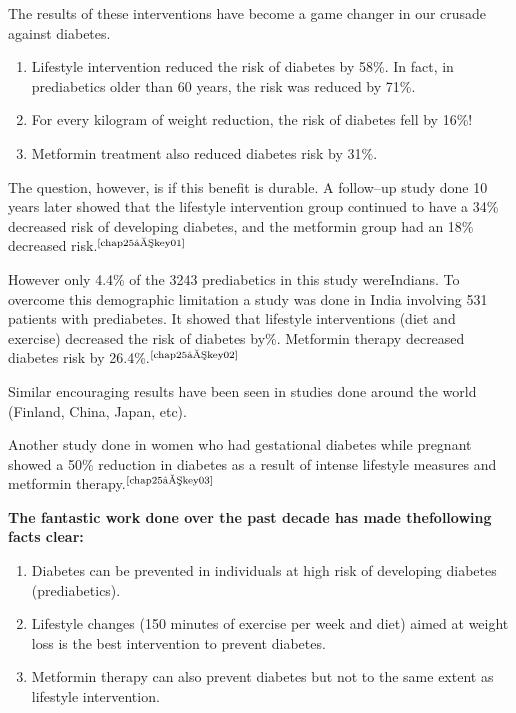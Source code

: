 The results of these interventions have become a game changer in our crusade against diabetes.

\begin{enumerate}[•]
\itemsep=0pt
\item Lifestyle intervention reduced the risk of diabetes by 58\%. In fact, in prediabetics older than 60 years, the risk was reduced by 71\%.
\item For every kilogram of weight reduction, the risk of diabetes fell by 16\%!
\item Metformin treatment also reduced diabetes risk by 31\%.
\end{enumerate}

The question, however, is if this benefit is durable. A follow–up study done 10 years later showed that the lifestyle intervention group continued to have a 34\% decreased risk of developing diabetes, and the metformin group had an 18\% decreased risk.$^{\text{\cite{chap25–key01}}}$

However only 4.4\% of the 3243 prediabetics in this study were\break Indians. To overcome this demographic limitation a study was done in India involving 531 patients with prediabetes. It showed that lifestyle interventions (diet and exercise) decreased the risk of diabetes by\%. Metformin therapy decreased diabetes risk by 26.4\%.$^{\text{\cite{chap25–key02}}}$

Similar encouraging results have been seen in studies done around the world (Finland, China, Japan, etc).

Another study done in women who had gestational diabetes while pregnant showed a 50\% reduction in diabetes as a result of intense lifestyle measures and metformin therapy.$^{\text{\cite{chap25–key03}}}$

\vskip 6pt

\noindent\textbf{The fantastic work done over the past decade has made the\break following facts clear:}

\begin{enumerate}[•]
\itemsep=0pt
\item Diabetes can be prevented in individuals at high risk of developing diabetes (prediabetics).
\item Lifestyle changes (150 minutes of exercise per week and diet) aimed at weight loss is the best intervention to prevent diabetes.
\item Metformin therapy can also prevent diabetes but not to the same extent as lifestyle intervention.
\end{enumerate}

